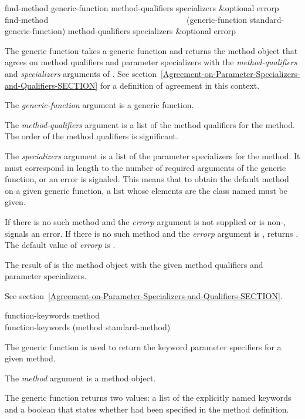 \begin{defun}
find-method generic-function method-qualifiers specializers &optional errorp \\
find-method~~~~~~~~~~~~~~~~~~~~~~~~~~~~~~~~~ (generic-function standard-generic-function)
   method-qualifiers specializers &optional errorp

The generic function  takes a generic function and
returns the method object that agrees on method qualifiers and
parameter specializers with the {\it method-qualifiers\/} and {\it
specializers\/} arguments of .
See section~\ref{Agreement-on-Parameter-Specializers-and-Qualifiers-SECTION} for a
definition of agreement in this context.





The {\it generic-function\/} argument is a generic function.

The {\it method-qualifiers\/} argument is a list of the
method qualifiers for the method.   The order of the method qualifiers
is significant.  

The {\it specializers\/} argument is a list of the parameter
specializers for the method.  It must correspond in length to
the number of required arguments of the generic function, or
an error is signaled.  This means that to obtain the
default method on a given generic function, a list whose
elements are the class named  must be given.

If there is no such method and the {\it errorp\/} argument is
not supplied or is non-,  signals an error.
If there is no such method and the {\it errorp\/} argument is
,  returns .  The default value of
{\it errorp\/} is .


The result of  is the method object with the given
method qualifiers and parameter specializers.

See section~\ref{Agreement-on-Parameter-Specializers-and-Qualifiers-SECTION}.

\end{defun}


\begin{defun}
function-keywords method \\
function-keywords (method standard-method)

The generic function  is used to return the keyword
parameter specifiers for a given method.





The {\it method\/} argument is a method object.


The generic function  returns two values:
a list of the explicitly named keywords and a boolean that states whether
 had been specified in the method definition.

\end{defun}


